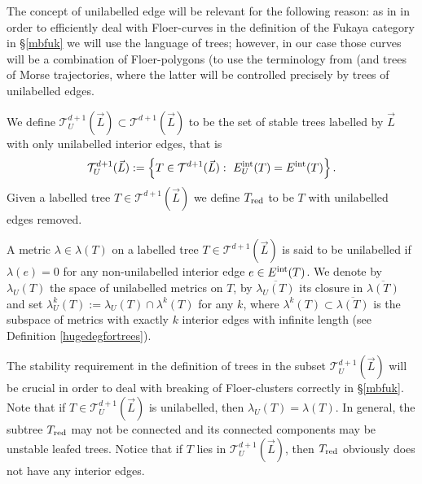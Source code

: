 \begin{rem}
	The concept of unilabelled edge will be relevant for the following reason: as in \cite{Se:book-fukaya-categ} in order to efficiently deal with Floer-curves in the definition of the Fukaya category in \S \ref{mbfuk} we will use the language of trees; however, in our case those curves will be a combination of Floer-polygons (to use the terminology from \cite{Se:book-fukaya-categ} (and trees of Morse trajectories, where the latter will be controlled precisely by trees of unilabelled edges. 
\end{rem}\begin{dfn}
	We define $\mathcal{T}^{d+1}_U(\vec{L})\subset \mathcal{T}^{d+1}(\vec{L})$ to be the set of stable trees labelled by $\vec{L}$ with only unilabelled interior edges, that is $$\mathcal{T}^{d+1}_U(\vec{L}):=\left\{ T\in \mathcal{T}^{d+1}(\vec{L}): \ E^\textnormal{int}_U(T)=E^\textnormal{int}(T)\right\}.$$Given a labelled tree $T\in \mathcal{T}^{d+1}(\vec{L})$ we define $T_\textnormal{red}$ to be $T$ with unilabelled edges removed.
\end{dfn}   \begin{dfn}
	A metric $\lambda\in \lambda(T)$ on a labelled tree $T\in \mathcal{T}^{d+1}(\vec{L})$ is said to be unilabelled if $\lambda(e)=0$ for any non-unilabelled interior edge $e\in E^\textnormal{int}(T)$. We denote by $\lambda_U(T)$ the space of unilabelled metrics on $T$,  by $\overline{\lambda_U(T)}$ its closure in $\overline{\lambda(T)}$ and set $\lambda^k_U(T):=\lambda_U(T)\cap \lambda^k(T)$ for any $k$, where $\lambda^k(T)\subset\overline{\lambda(T)}$ is the subspace of metrics with exactly $k$ interior edges with infinite length (see Definition \ref{hugedegfortrees}). 
\end{dfn} 
\noindent The stability requirement in the definition of trees in the subset $\mathcal{T}^{d+1}_U(\vec{L})$ will be crucial in order to deal with breaking of Floer-clusters correctly in \S \ref{mbfuk}. %
Note that if $T\in \mathcal{T}^{d+1}_U(\vec{L})$ is unilabelled, then $\lambda_U(T)=\lambda(T)$.
In general, the subtree $T_\textnormal{red}$ may not be connected and its connected components may be unstable leafed trees. Notice that if $T$ lies in $\mathcal{T}^{d+1}_U(\vec{L})$, then $T_\textnormal{red}$ obviously does not have any interior edges. 

